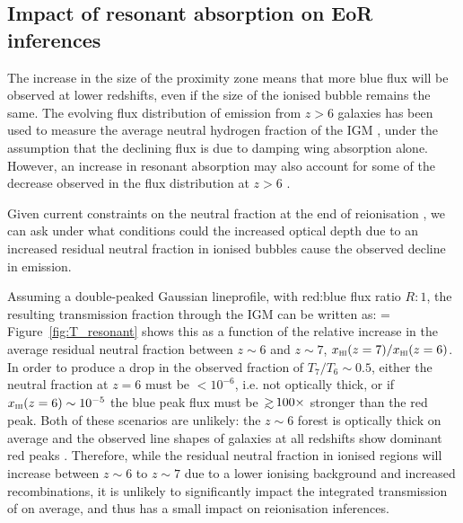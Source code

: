 \documentclass[fleqn,usenatbib]{mnras}
\begin{document}
\subsection{Impact of resonant absorption on EoR inferences}
\label{sec:disc_lyafrac}

The increase in the size of the proximity zone means that more blue flux will be observed at lower redshifts, even if the size of the ionised bubble remains the same. The evolving flux distribution of \lya emission from $z>6$ galaxies has been used to measure the average neutral hydrogen fraction of the IGM \citep{Mesinger2015,Mason2018}, under the assumption that the declining flux is due to damping wing absorption alone. However, an increase in resonant absorption may also account for some of the decrease observed in the \lya flux distribution at $z>6$ \citep[see e.g.,][]{Bolton2013a,Mesinger2015}.

Given current constraints on the neutral fraction at the end of reionisation \citep[$z<6$,][]{Fan2006}, we can ask under what conditions could the increased optical depth due to an increased residual neutral fraction in ionised bubbles cause the observed decline in \lya emission.

Assuming a double-peaked Gaussian \lya lineprofile, with red:blue flux ratio $R:1$, the resulting \lya transmission fraction through the IGM can be written as:
%
\BE \label{eqn:T_lya}
 = 
\EE
%
Figure~\ref{fig:T_resonant} shows this as a function of the relative increase in the average residual neutral fraction between $z\sim6$ and $z\sim7$, $\xHI(z=7)/\xHI(z=6)$. In order to produce a drop in the observed \lya fraction of $T_7/T_6 \sim 0.5$, either the neutral fraction at $z=6$ must be $<10^{-6}$, i.e. not optically thick, or if $\xHI(z=6) \sim 10^{-5}$ the blue peak flux must be $\simgt100\times$ stronger than the red peak. Both of these scenarios are unlikely: the $z\sim6$ \lya forest is optically thick on average \citep[e.g,][find $\xHI(z \sim 6) \simgt 10^{-4}$]{Fan2006} and the observed \lya line shapes of galaxies at all redshifts show dominant red peaks \citep[e.g.,][]{Trainor2015,Rivera-Thorsen2015,Yang2017a,Steidel2018}. Therefore, while the residual neutral fraction in ionised regions will increase between $z\sim6$ to $z\sim7$ due to a lower ionising background and increased recombinations, it is unlikely to significantly impact the integrated transmission of \lya on average, and thus has a small impact on reionisation inferences. 
\end{document}
